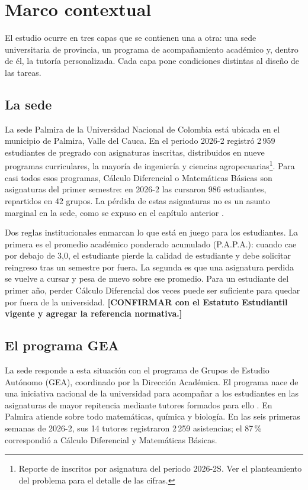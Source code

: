 \section{Marco contextual}
\label{sec:marco_contextual}

El estudio ocurre en tres capas que se contienen una a otra: una sede universitaria de provincia, un programa de acompañamiento académico y, dentro de él, la tutoría personalizada. Cada capa pone condiciones distintas al diseño de las tareas.

\subsection*{La sede}

La sede Palmira de la Universidad Nacional de Colombia está ubicada en el municipio de Palmira, Valle del Cauca. En el periodo 2026-2 registró 2\,959 estudiantes de pregrado con asignaturas inscritas, distribuidos en nueve programas curriculares, la mayoría de ingeniería y ciencias agropecuarias\footnote{Reporte de inscritos por asignatura del periodo 2026-2S. Ver el planteamiento del problema para el detalle de las cifras.}. Para casi todos esos programas, Cálculo Diferencial o Matemáticas Básicas son asignaturas del primer semestre: en 2026-2 las cursaron 986 estudiantes, repartidos en 42 grupos. La pérdida de estas asignaturas no es un asunto marginal en la sede, como se expuso en el capítulo anterior \parencite{unal2021gea}.

Dos reglas institucionales enmarcan lo que está en juego para los estudiantes. La primera es el promedio académico ponderado acumulado (P.A.P.A.): cuando cae por debajo de 3,0, el estudiante pierde la calidad de estudiante y debe solicitar reingreso tras un semestre por fuera. La segunda es que una asignatura perdida se vuelve a cursar y pesa de nuevo sobre ese promedio. Para un estudiante del primer año, perder Cálculo Diferencial dos veces puede ser suficiente para quedar por fuera de la universidad. \textbf{[CONFIRMAR con el Estatuto Estudiantil vigente y agregar la referencia normativa.]}

\subsection*{El programa GEA}

La sede responde a esta situación con el programa de Grupos de Estudio Autónomo (GEA), coordinado por la Dirección Académica. El programa nace de una iniciativa nacional de la universidad para acompañar a los estudiantes en las asignaturas de mayor repitencia mediante tutores formados para ello \parencite{unal2021gea}. En Palmira atiende sobre todo matemáticas, química y biología. En las seis primeras semanas de 2026-2, sus 14 tutores registraron 2\,259 asistencias; el 87\,\% correspondió a Cálculo Diferencial y Matemáticas Básicas.

